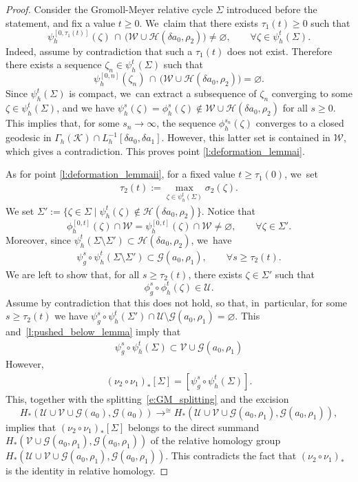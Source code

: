 \documentclass[JEP,XML,SOM,Unicode,NoFloatCountersInSection,published]{cedram}
\let\sep\mid
\newcommand{\GG}{\mathcal{G}}
\newcommand{\HH}{\mathcal{H}}
\newcommand{\KK}{\mathcal{K}}
\newcommand{\UU}{\mathcal{U}}
\newcommand{\VV}{\mathcal{V}}
\newcommand{\WW}{\mathcal{W}}
\DeclareMathOperator*{\toup}{\longrightarrow}
\let\ttoup\toup
\theoremstyle{plain}
\theoremstyle{definition}
\begin{document}
\begin{proof}
Consider the Gromoll-Meyer relative cycle $\Sigma$ introduced before the statement, and fix a value $t\geq0$. We~claim that there exists $\tau_1(t)\geq0$ such that
\[
\psi_h^{[0,\tau_1(t)]}(\zeta)\, \cap\, \big(\WW\cup\HH(\delta a_0,\rho_2)\big)\neq\varnothing,
\qquad
\forall \zeta\in\psi_h^t(\Sigma).
\]
Indeed, assume by contradiction that such a $\tau_1(t)$ does not exist. Therefore there exists a sequence $\zeta_n\in\psi_h^t(\Sigma)$ such that
\[
\psi_h^{[0,n]}(\zeta_n)\, \cap\, \big(\WW\cup\HH(\delta a_0,\rho_2)\big)=\varnothing.
\]
Since $\psi_h^t(\Sigma)$ is compact, we~can extract a subsequence of $\zeta_n$ converging to some $\zeta\in\psi_h^t(\Sigma)$, and we have $\psi_h^s(\zeta)=\phi_h^s(\zeta)\not\in\WW\cup\HH(\delta a_0,\rho_2)$ for all $s\geq0$. This implies that, for some $s_n\to\infty$, the sequence $\phi_h^{s_n}(\zeta)$ converges to a closed geodesic in $\Gamma_h(\KK)\cap L_h^{-1}[\delta a_0,\delta a_1]$. However, this latter set is contained in $\WW$, which gives a contradiction. This proves point \eqref{l:deformation_lemmai}.

As for point \eqref{l:deformation_lemmaii}, for a fixed value $t\geq\tau_1(0)$, we~set
\begin{align*}
\tau_2(t):=\max_{\zeta\in\psi_h^t(\Sigma)} \sigma_2(\zeta).
\end{align*}
We set
$\Sigma':=\big\{\zeta\in\Sigma\sep \psi_h^t(\zeta)\not\in \HH(\delta a_0,\rho_2) \big\}$.
Notice that
\[
\phi_h^{[0,t]}(\zeta)\cap \WW
=\psi_h^{[0,t]}(\zeta)\cap \WW\neq\varnothing,
\qquad\forall\zeta\in\Sigma'.
\]
Moreover, since $\psi_h^{t}(\Sigma\setminus\Sigma') \subset \HH(\delta a_0,\rho_2)$, we~have
\begin{align}
\label{l:pushed_below_lemma}
\psi_g^{s}\circ \psi_h^{t}(\Sigma\setminus\Sigma')\subset\GG(a_0,\rho_1),\qquad\forall s\geq\tau_2(t).
\end{align}
We are left to show that, for all $s\geq\tau_2(t)$, there exists $\zeta\in\Sigma'$ such that \[
\phi_g^s\circ\phi_h^t(\zeta)\in\UU.
\]
Assume by contradiction that this does not hold, so that, in~particular, for some $s\geq\tau_2(t)$ we have
$\psi_g^s\circ\psi_h^t(\Sigma')\cap\UU\setminus\GG(a_0,\rho_1)=\varnothing$. This and~\eqref{l:pushed_below_lemma} imply that
\begin{align*}
\psi_g^s\circ\psi_h^t(\Sigma)
\subset
\VV\cup\GG(a_0,\rho_1)
\end{align*}
However,
\begin{align*}
(\nu_2\circ\nu_1)_*[\Sigma]=[\psi_g^s\circ\psi_h^t(\Sigma)].
\end{align*}
This, together with the splitting~\eqref{e:GM_splitting} and the excision
\[
H_*(\UU\cup\VV\cup\GG(a_0) , \GG(a_0))
\ttoup^{\cong}
H_*(\UU\cup\VV\cup\GG(a_0,\rho_1) , \GG(a_0,\rho_1)),
\]
implies that $(\nu_2\circ\nu_1)_*[\Sigma]$ belongs to the direct summand $H_*(\VV\cup\GG(a_0,\rho_1) , \GG(a_0,\rho_1))$ of the relative homology group $H_*(\UU\cup\VV\cup\GG(a_0,\rho_1) , \GG(a_0,\rho_1))$. This contradicts the fact that $(\nu_2\circ\nu_1)_*$ is the identity in relative homology.
\end{proof}
\end{document}
